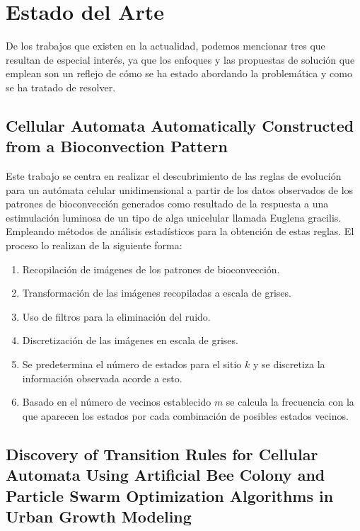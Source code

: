 \chapter{Estado del Arte}

De los trabajos que existen en la actualidad, podemos mencionar tres que resultan de especial interés, ya que los enfoques y las propuestas de solución que emplean son un reflejo de cómo se ha estado abordando la problemática y como se ha tratado de resolver. 

\section{Cellular Automata Automatically Constructed from a Bioconvection Pattern}

Este trabajo \citep{kawaharada2016cellular} se centra en realizar el descubrimiento de las reglas de evolución para un autómata celular unidimensional a partir de los datos observados de los patrones de bioconvección generados como resultado de la respuesta a una estimulación luminosa de un tipo de alga unicelular llamada Euglena gracilis. Empleando métodos de análisis estadísticos para la obtención de estas reglas.
El proceso lo realizan de la siguiente forma:

\begin{enumerate}
	\item Recopilación de imágenes de los patrones de bioconvección.
	\item Transformación de las imágenes recopiladas a escala de grises.
	\item Uso de filtros para la eliminación del ruido.
	\item Discretización de las imágenes en escala de grises.
	\item Se predetermina el número de estados para el sitio $k$ y se discretiza la información observada acorde a esto.
	\item Basado en el número de vecinos establecido $m$ se calcula la frecuencia con la que aparecen los estados por cada combinación de posibles estados vecinos.
\end{enumerate}

\section{Discovery of Transition Rules for Cellular Automata Using Artificial Bee Colony and Particle Swarm Optimization Algorithms in Urban Growth Modeling}

